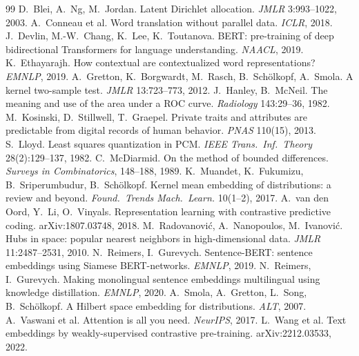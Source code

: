 \documentclass[10pt,twocolumn]{article}
\begin{document}
\footnotesize
\begin{thebibliography}{99}\setlength{\itemsep}{0pt}
 D.~Blei, A.~Ng, M.~Jordan. Latent Dirichlet allocation. \emph{JMLR} 3:993--1022, 2003.
 A.~Conneau et al. Word translation without parallel data. \emph{ICLR}, 2018.
 J.~Devlin, M.-W.~Chang, K.~Lee, K.~Toutanova. BERT: pre-training of deep bidirectional Transformers for language understanding. \emph{NAACL}, 2019.
 K.~Ethayarajh. How contextual are contextualized word representations? \emph{EMNLP}, 2019.
 A.~Gretton, K.~Borgwardt, M.~Rasch, B.~Sch\"olkopf, A.~Smola. A kernel two-sample test. \emph{JMLR} 13:723--773, 2012.
 J.~Hanley, B.~McNeil. The meaning and use of the area under a ROC curve. \emph{Radiology} 143:29--36, 1982.
 M.~Kosinski, D.~Stillwell, T.~Graepel. Private traits and attributes are predictable from digital records of human behavior. \emph{PNAS} 110(15), 2013.
 S.~Lloyd. Least squares quantization in PCM. \emph{IEEE Trans.\ Inf.\ Theory} 28(2):129--137, 1982.
 C.~McDiarmid. On the method of bounded differences. \emph{Surveys in Combinatorics}, 148--188, 1989.
 K.~Muandet, K.~Fukumizu, B.~Sriperumbudur, B.~Sch\"olkopf. Kernel mean embedding of distributions: a review and beyond. \emph{Found.\ Trends Mach.\ Learn.} 10(1--2), 2017.
 A.~van den Oord, Y.~Li, O.~Vinyals. Representation learning with contrastive predictive coding. arXiv:1807.03748, 2018.
 M.~Radovanovi\'c, A.~Nanopoulos, M.~Ivanovi\'c. Hubs in space: popular nearest neighbors in high-dimensional data. \emph{JMLR} 11:2487--2531, 2010.
 N.~Reimers, I.~Gurevych. Sentence-BERT: sentence embeddings using Siamese BERT-networks. \emph{EMNLP}, 2019.
 N.~Reimers, I.~Gurevych. Making monolingual sentence embeddings multilingual using knowledge distillation. \emph{EMNLP}, 2020.
 A.~Smola, A.~Gretton, L.~Song, B.~Sch\"olkopf. A Hilbert space embedding for distributions. \emph{ALT}, 2007.
 A.~Vaswani et al. Attention is all you need. \emph{NeurIPS}, 2017.
 L.~Wang et al. Text embeddings by weakly-supervised contrastive pre-training. arXiv:2212.03533, 2022.
\end{thebibliography}
\end{document}
